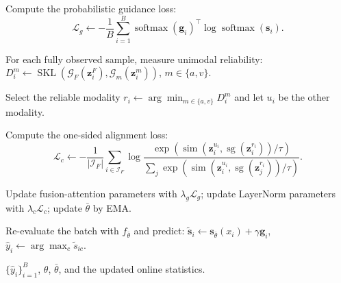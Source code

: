 \begin{algorithm}[t]
\begin{algorithmic}[1]
\State Compute the probabilistic guidance loss:
\Statex
\[
\mathcal{L}_g\gets-\frac{1}{B}\sum_{i=1}^{B}
\operatorname{softmax}(\bm g_i)^{\top}
\log\operatorname{softmax}(\bm s_i).
\]

\State For each fully observed sample, measure unimodal reliability:
\Statex \hfill
$D_i^m\gets\operatorname{SKL}
(\mathcal{G}_F(\bm z_i^F),\mathcal{G}_m(\bm z_i^m))$,
$m\in\{a,v\}$.

\State Select the reliable modality
$r_i\gets\arg\min_{m\in\{a,v\}}D_i^m$ and let $u_i$ be the other modality.

\State Compute the one-sided alignment loss:
\Statex
\[
\mathcal{L}_c\gets-\frac{1}{|\mathcal{I}_F|}
\sum_{i\in\mathcal{I}_F}
\log\frac{
\exp(\operatorname{sim}(\bm z_i^{u_i},
\operatorname{sg}(\bm z_i^{r_i}))/\tau)}{
\sum_j\exp(\operatorname{sim}(\bm z_i^{u_i},
\operatorname{sg}(\bm z_j^{r_i}))/\tau)}.
\]

\State Update fusion-attention parameters with $\lambda_g\mathcal{L}_g$;
update LayerNorm parameters with $\lambda_c\mathcal{L}_c$;
update $\bar\theta$ by EMA.

\State Re-evaluate the batch with $f_{\bar\theta}$ and predict:
\Statex \hfill
$\widetilde{\bm s}_i\gets\bm s_{\bar\theta}(x_i)+\gamma\bm g_i$,
$\widehat y_i\gets\arg\max_c\widetilde s_{ic}$.

\State \Return $\{\widehat y_i\}_{i=1}^{B}$, $\theta$, $\bar\theta$, and the updated online statistics.
\end{algorithmic}
\end{algorithm}
